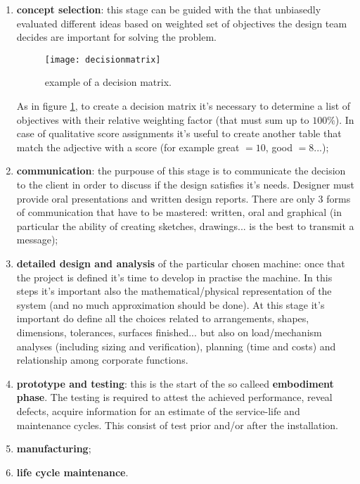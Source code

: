 \begin{enumerate}
		\item \textbf{concept selection}: this stage can be guided with the  that unbiasedly evaluated different ideas based on weighted set of objectives the design team decides are important for solving the problem.
		\begin{figure}[bt]
			\centering \texttt{[image: decisionmatrix]}
			\caption{example of a decision matrix.} \label{fig:bas:decisionmatrix}
		\end{figure}
		As in figure \ref{fig:bas:decisionmatrix}, to create a decision matrix it's necessary to determine a list of objectives with their relative weighting factor (that must sum up to $100\%$). In case of qualitative score assignments it's useful to create another table that match the adjective with a score (for example great $=10$, good $=8$...);
		
		\item \textbf{communication}: the purpouse of this stage is to communicate the decision to the client in order to discuss if the design satisfies it's needs. Designer must provide oral presentations and written design reports. There are only 3 forms of communication that have to be mastered: written, oral and graphical (in particular the ability of creating sketches, drawings... is the best to transmit a message);
		
		\item \textbf{detailed design and analysis} of the particular chosen machine: once that the project is defined it's time to develop in practise the machine. In this steps it's important also the mathematical/physical representation of the system (and no much approximation should be done). At this stage it's important do define all the choices related to  arrangements, shapes, dimensions, tolerances, surfaces finished... but also on load/mechanism analyses (including sizing and verification), planning (time and costs) and relationship among corporate functions.
		
		\item \textbf{prototype and testing}: this is the start of the so calleed \textbf{embodiment phase}. The testing is required to attest the achieved performance, reveal defects, acquire information for an estimate of the service-life and maintenance cycles. This consist of test prior and/or after the installation.
		
		\item \textbf{manufacturing};
		\item \textbf{life cycle maintenance}.
		
	\end{enumerate}
	
